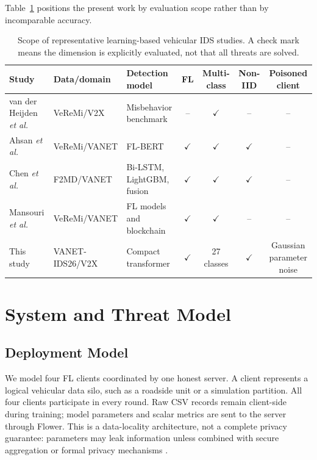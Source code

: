 \documentclass[journal]{IEEEtran}
\begin{document}
Table~\ref{tab:related} positions the present work by evaluation scope rather than by incomparable accuracy.

\begin{table}[t]
\centering
\caption{Scope of representative learning-based vehicular IDS studies. A check mark means the dimension is explicitly evaluated, not that all threats are solved.}
\label{tab:related}
\begin{tabular}{p{3.0cm}p{2.6cm}p{2.8cm}cccc}
\toprule
Study & Data/domain & Detection model & FL & Multi-class & Non-IID & Poisoned client \\
\midrule
van der Heijden \emph{et al.} \cite{vanderheijden2018veremi} & VeReMi/V2X & Misbehavior benchmark & -- & $\checkmark$ & -- & -- \\
Ahsan \emph{et al.} \cite{ahsan2024privacy} & VeReMi/VANET & FL-BERT & $\checkmark$ & $\checkmark$ & $\checkmark$ & -- \\
Chen \emph{et al.} \cite{chen2024fast} & F2MD/VANET & Bi-LSTM, LightGBM, fusion & $\checkmark$ & $\checkmark$ & $\checkmark$ & -- \\
Mansouri \emph{et al.} \cite{mansouri2025distributed} & VeReMi/VANET & FL models and blockchain & $\checkmark$ & $\checkmark$ & -- & -- \\
This study & VANET-IDS26/V2X & Compact transformer & $\checkmark$ & 27 classes & $\checkmark$ & Gaussian parameter noise \\
\bottomrule
\end{tabular}
\end{table}

\section{System and Threat Model}

\subsection{Deployment Model}
We model four FL clients coordinated by one honest server. A client represents a logical vehicular data silo, such as a roadside unit or a simulation partition. All four clients participate in every round. Raw CSV records remain client-side during training; model parameters and scalar metrics are sent to the server through Flower. This is a data-locality architecture, not a complete privacy guarantee: parameters may leak information unless combined with secure aggregation or formal privacy mechanisms \cite{kairouz2021advances}.
\end{document}
